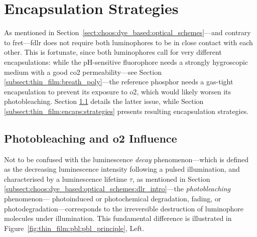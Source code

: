 \section{Encapsulation Strategies}\label{sect:thin_film:encaps}

As mentioned in Section~\ref{sect:choos:dye_based:optical_schemes}---and contrary to \gls{fret}---\gls{fdlr} does not require both luminophores to be in close contact with each other. This is fortunate, since both luminophores call for very different encapsulations: while the pH-sensitive fluorophore needs a strongly hygroscopic medium with a good \gls{co2} permeability---see Section \ref{subsect:thin_film:breath_poly}---the reference phosphor needs a gas-tight encapsulation to prevent its exposure to \gls{o2}, which would likely worsen its photobleaching. Section \ref{subsect:thin_film:encaps:photobleaching} details the latter issue, while Section \ref{subsect:thin_film:encaps:strategies} presents resulting encapsulation strategies.

\subsection{Photobleaching and \texorpdfstring{\gls{o2}}{O2} Influence}\label{subsect:thin_film:encaps:photobleaching}

Not to be confused with the luminescence \emph{decay} phenomenon---which is defined as the decreasing luminescence intensity following a pulsed illumination, and characterised by a luminescence lifetime $\tau$, as mentioned in Section \ref{subsect:choos:dye_based:optical_schemes:dlr_intro}---the \emph{photobleaching} phenomenon---\aka{} photoinduced or photochemical degradation, fading, or photodegradation---corresponds to the irreversible destruction of luminophore molecules under illumination. This fundamental difference is illustrated in Figure~\ref{fig:thin_film:pbl:pbl_principle}, Left.

